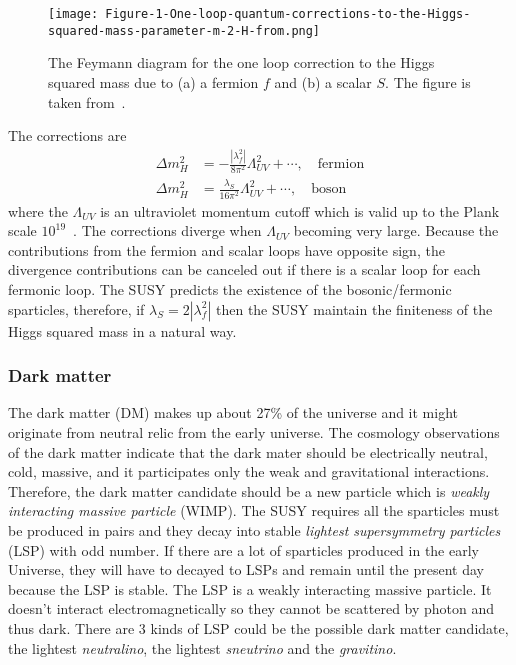 \begin{figure}[htbp]
\begin{center}
\texttt{[image: Figure-1-One-loop-quantum-corrections-to-the-Higgs-squared-mass-parameter-m-2-H-from.png]}
\caption{The Feymann diagram for the one loop correction to the Higgs squared mass due to (a) a fermion $f$ and (b) a scalar $S$.
The figure is taken from~\cite{Martin:1997ns}.}
\label{fig:susy_one_loop_corrections}
\end{center}
\end{figure}

The corrections are
%
\begin{align}
\Delta m_{H}^{2} &= - \frac{|\lambda_{f}^{2}|}{8\pi^{2}} \Lambda_{UV}^{2} + \cdots, \quad \mathrm{fermion}\\
\Delta m_{H}^{2} &= \frac{\lambda_{S}}{16\pi^{2}} \Lambda_{UV}^{2} + \cdots, \quad \mathrm{boson}
\end{align}
%
where the $\Lambda_{UV}$ is an ultraviolet momentum cutoff which is valid up to the Plank scale $10^{19}$~{\GeV}.
The corrections diverge when $\Lambda_{UV}$ becoming very large.
Because the contributions from the fermion and scalar loops have opposite sign, the divergence contributions can be canceled out if there is a scalar loop for each fermonic loop.
The SUSY predicts the existence of the bosonic/fermonic sparticles, therefore, if $\lambda_{S} = 2 |\lambda_{f}^{2}|$ then the SUSY maintain the finiteness of the Higgs squared mass in a natural way.


\subsubsection{Dark matter}
\label{subsubsec:susy_dark_matter}
The dark matter (DM) makes up about 27\% of the universe and it might originate from neutral relic from the early universe.
The cosmology observations of the dark matter indicate that the dark mater should be electrically neutral, cold, massive, and it participates only the weak and gravitational interactions.
Therefore, the dark matter candidate should be a new particle which is \textit{weakly interacting massive particle} (WIMP).
The SUSY requires all the sparticles must be produced in pairs and they decay into stable \textit{lightest supersymmetry particles} (LSP) with odd number.
If there are a lot of sparticles produced in the early Universe, they will have to decayed to LSPs and remain until the present day because the LSP is stable.
The LSP is a weakly interacting massive particle.
It doesn't interact electromagnetically so they cannot be scattered by photon and thus dark.
There are 3 kinds of LSP could be the possible dark matter candidate, the lightest \textit{neutralino}, the lightest \textit{sneutrino} and the \textit{gravitino}.

